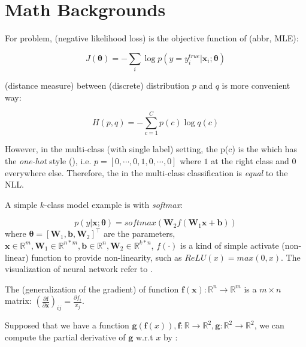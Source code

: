 \section{Math Backgrounds}
For  problem,  (negative likelihood loss) is the objective function of  (abbr, MLE):

\begin{equation}
J(\bm{\theta}) = - \sum_i \log p(y = y^{true}_i | \bm{x}_i; \bm{\theta})
\end{equation}

 (distance measure) between (discrete) distribution $p$ and $q$ is more convenient way:

\begin{equation}
H(p, q) = - \sum_{c=1}^C p(c) \log q(c)
\end{equation}

However, in the multi-class (with single label) setting, the p(c) is the  which has the \emph{one-hot} style (), i.e. $p = [0, \cdots, 0, 1, 0, \cdots, 0]$ where $1$ at the right class and $0$ everywhere else.
Therefore, the  in the multi-class classification is \emph{equal} to the NLL.

A simple $k$-class model example is  with \emph{softmax}:

\begin{equation}
	p(y|\bm{x}; \bm{\theta}) = softmax(\bm{W}_2 f(\bm{W}_1 \bm{x} + \bm{b}))
\end{equation}
where $\bm{\theta} = [\bm{W}_1, \bm{b}, \bm{W}_2]^\top $ are the parameters, $\bm{x} \in \mathbb{R}^m, \bm{W}_1 \in \mathbb{R}^{n * m}, \bm{b} \in \mathbb{R}^n, \bm{W}_2 \in \mathbb{R}^{k * n}$, $f(\cdot)$ is a kind of simple activate (non-linear) function to provide non-linearity, such as $ReLU(x) = max(0, x)$.
The visualization of neural network refer to .

The  (generalization of the gradient) of function $\bm{f}(\bm{x}): \mathbb{R}^n \rightarrow \mathbb{R}^m$ is a $m \times n$ matrix: $\left(\frac{\partial \bm{f}}{\partial \bm{x}}\right)_{ij} = \frac{\partial f_i}{x_j}$.

Supposed that we have a function $\bm{g}(\bm{f}(x)), \bm{f}: \mathbb{R} \rightarrow \mathbb{R}^2, \bm{g}: \mathbb{R}^2 \rightarrow \mathbb{R}^2$, we can compute the partial derivative of $\bm{g}$ w.r.t $x$ by :

